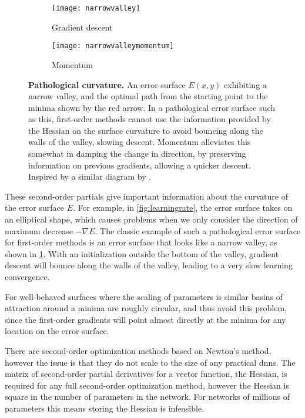 \documentclass[thesis]{subfiles}
\begin{document}
\begin{figure}[tbp]
\centering
\begin{subfigure}[b]{0.45\textwidth}
\texttt{[image: narrowvalley]}
\caption{Gradient descent}\label{fig:narrowvalleysgd}
\end{subfigure}
\begin{subfigure}[b]{0.45\textwidth}
\texttt{[image: narrowvalleymomentum]}
\caption{Momentum}\label{fig:narrowvalleymomentum}
\end{subfigure}
\caption[Pathological curvature]{\textbf{Pathological curvature.} An error surface $E(x, y)$ exhibiting a narrow valley, and the optimal path from the starting point to the minima shown by the red arrow. In a pathological error surface such as this, first-order methods cannot use the information provided by the Hessian on the surface curvature to avoid bouncing along the walls of the valley, slowing descent. Momentum alleviates this somewhat in damping the change in direction, by preserving information on previous gradients, allowing a quicker descent. Inspired by a similar diagram by \citet{martens2010deep}.}
\label{fig:pathological}
\end{figure}
These second-order partials give important information about the curvature of the error surface $E$. For example, in \cref{fig:learningrate}, the error surface takes on an elliptical shape, which causes problems when we only consider the direction of maximum decrease $-\nabla E$. The classic example of such a pathological error surface for first-order methods is an error surface that looks like a narrow valley, as shown in \cref{fig:narrowvalleysgd}. With an initialization outside the bottom of the valley, gradient descent will bounce along the walls of the valley, leading to a very slow learning convergence.

For well-behaved surfaces where the scaling of parameters is similar
basins of attraction around a minima are roughly circular, and thus avoid this problem, since the first-order gradients will point almost directly at the minima for any location on the error surface.

There are second-order optimization methods based on Newton's method, however the issue is that they do not scale to the size of any practical \glspl{dnn}. The matrix of second-order partial derivatives for a vector function, the Hessian, is required for any full second-order optimization method, however the Hessian is square in the number of parameters in the network. For networks of millions of parameters this means storing the Hessian is infeasible.
\end{document}
